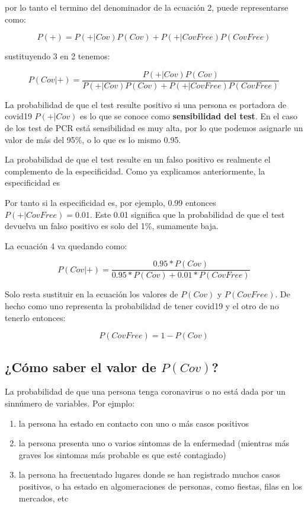 \documentclass[10pt,a4paper]{article}
\begin{document}
por lo tanto el termino del denominador de la ecuación 2, puede representarse como:

\begin{equation}
P(+) = P(+|Cov)P(Cov) + P(+|CovFree)P(CovFree)
\end{equation}

sustituyendo 3 en 2 tenemos:

\begin{equation}
P(Cov|+) = \frac{P(+|Cov)P(Cov)}{P(+|Cov)P(Cov) + P(+|CovFree)P(CovFree)}
\end{equation}


La probabilidad de que el test resulte positivo si una persona es portadora de covid19 $P(+|Cov)$ es lo que se conoce como \textbf{sensibilidad del test}. En el caso de los test de PCR está sensibilidad es muy alta, por lo que podemos asignarle un valor de más del 95\%, o lo que es lo mismo 0.95.

La probabilidad de que el test resulte en un falso positivo es realmente el complemento de la especificidad. Como ya explicamos anteriormente, la especificidad es 

Por tanto si la especificidad es, por ejemplo, 0.99 entonces $P(+|CovFree) = 0.01$. Este 0.01 significa que la probabilidad de que el test devuelva un falso positivo es solo del 1\%, sumamente baja.

La ecuación 4 va quedando como:

\begin{equation}
P(Cov|+) = \frac{0.95*P(Cov)}{0.95*P(Cov) + 0.01*P(CovFree)}
\end{equation}

Solo resta sustituir en la ecuación los valores de $P(Cov)$ y $P(CovFree)$. De hecho como uno representa la probabilidad de tener covid19 y el otro de no tenerlo entonces:

\begin{equation*}
P(CovFree) = 1 - P(Cov)
\end{equation*}

\subsection{¿Cómo saber el valor de $P(Cov)$?}

La probabilidad de que una persona tenga coronavirus o no está dada por un sinnúmero de variables. Por ejmplo:
\begin{enumerate}
\item la persona ha estado en contacto con uno o más casos positivos
\item la persona presenta uno o varios sintomas de la enfermedad (mientras más graves los sintomas más probable es que esté contagiado)
\item la persona ha frecuentado lugares donde se han registrado muchos casos positivos, o ha estado en algomeraciones de personas, como fiestas, filas en los mercados, etc
\end{enumerate}
\end{document}
